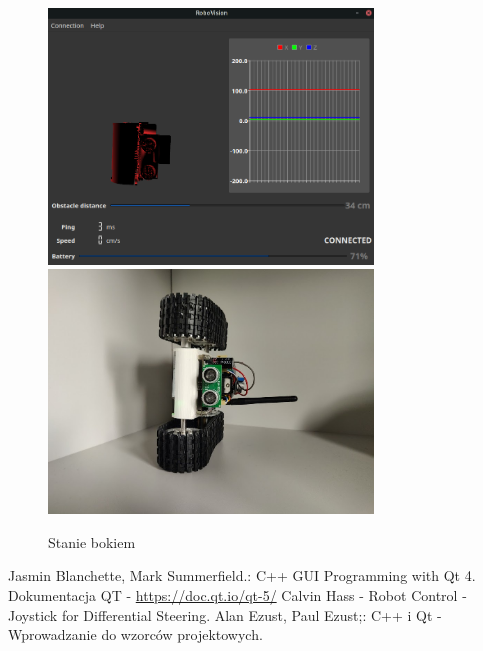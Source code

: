 \documentclass[12pt,a4paper,polish]{article}
\begin{document}
  \begin{figure}[h]
    \centering
    \includegraphics[width=0.77\textwidth]{img/final/4.png}
    \includegraphics[width=0.77\textwidth]{img/final/4e.jpg}
    \caption{Stanie bokiem}
    \label{fig:test4}
  \end{figure}


  \begin{thebibliography}{99}
    \bibitem{} Jasmin Blanchette, Mark Summerfield.: C++ GUI Programming with Qt 4.
    \bibitem{} Dokumentacja QT -  \url{https://doc.qt.io/qt-5/}
    \bibitem{} Calvin Hass - Robot Control - Joystick for Differential Steering.
    \bibitem{} Alan Ezust, Paul Ezust;: C++ i Qt - Wprowadzanie do wzorców projektowych.
  \end{thebibliography}
\end{document}
